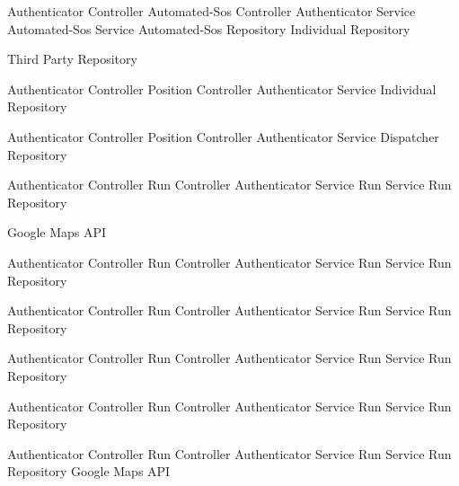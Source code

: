 \documentclass[a4paper]{article}
\begin{document}
\begin{description}
     {Authenticator Controller}
     {Automated-Sos Controller}
     {Authenticator Service}
     {Automated-Sos Service}
     {Automated-Sos Repository}
     {Individual Repository}
     
     {Third Party Repository}
     
     {Authenticator Controller}
     {Position Controller}
     {Authenticator Service}
     {Individual Repository}
     
     {Authenticator Controller}
     {Position Controller}
     {Authenticator Service}
     {Dispatcher Repository}
     
     {Authenticator Controller}
     {Run Controller}
     {Authenticator Service}
     {Run Service}
     {Run Repository}
     
     {Google Maps API}
     
     {Authenticator Controller}
     {Run Controller}
     {Authenticator Service}
     {Run Service}
     {Run Repository}
     
     {Authenticator Controller}
     {Run Controller}
     {Authenticator Service}
     {Run Service}
     {Run Repository}
     
     {Authenticator Controller}
     {Run Controller}
     {Authenticator Service}
     {Run Service}
     {Run Repository}
     
     {Authenticator Controller}
     {Run Controller}
     {Authenticator Service}
     {Run Service}
     {Run Repository}
     
     {Authenticator Controller}
     {Run Controller}
     {Authenticator Service}
     {Run Service}
     {Run Repository}
     {Google Maps API}
     
\end{description}
\end{document}
